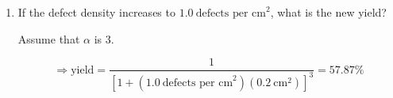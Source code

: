 \documentclass[fleqn]{article}
\begin{document}
\begin{enumerate}
\begin{enumerate}
			\item If the defect density increases to $1.0\ \text{defects per cm}^2$, what is the new yield?
			
			Assume that $\alpha$ is 3.
			
			\begin{equation*}
				\Rightarrow \text{yield} = \frac{1}{[1 + (1.0\ \text{defects per cm}^2)(0.2\ \text{cm}^2)]^3} = \mathbf{57.87\%}
			\end{equation*}
			
		\end{enumerate}
	\end{enumerate}
\end{document}
